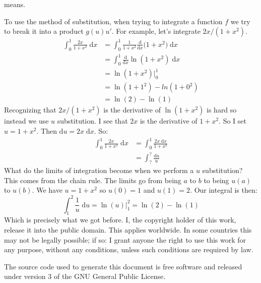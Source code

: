 \documentclass{article}
\begin{document}
    means.
    \par\hfill\par
    To use the method of substitution, when trying to integrate a function
    $f$ we try to break it into a product $g(u)u'$. For example, let's
    integrate $2x/(1+x^{2})$.
    \begin{align}
        \int_{0}^{1}\frac{2x}{1+x^{2}}\;\textrm{d}x
            &=\int_{0}^{1}\frac{1}{1+x^{2}}\frac{\textrm{d}}{\textrm{d}x}
                \big(1+x^{2}\big)\;\textrm{d}x\\
            &=\int_{0}^{1}\frac{\textrm{d}}{\textrm{d}x}
                \ln(1+x^{2})\;\textrm{d}x\\
            &=\ln(1+x^{2})\big|_{0}^{1}\\
            &=\ln(1+1^{2})-ln(1+0^{2})\\
            &=\ln(2)-\ln(1)
    \end{align}
    Recognizing that $2x/(1+x^{2})$ is the derivative of $\ln(1+x^{2})$ is hard
    so instead we use $u$ substitution. I see that
    $2x$ is the derivative of $1+x^{2}$. So I set $u=1+x^{2}$. Then
    $\textrm{d}u=2x\;\textrm{d}x$. So:
    \begin{align}
        \int_{0}^{1}\frac{2x}{1+x^{2}}\;\textrm{d}x
            &=\int_{0}^{1}\frac{2x\;\textrm{d}x}{1+x^{2}}\\
            &=\int_{?}^{?}\frac{\textrm{d}u}{u}
    \end{align}
    What do the limits of integration become when we perform a $u$ substitution?
    This comes from the chain rule. The limits go from being $a$ to $b$ to
    being $u(a)$ to $u(b)$. We have $u=1+x^{2}$ so $u(0)=1$ and $u(1)=2$.
    Our integral is then:
    \begin{equation}
        \int_{1}^{2}\frac{1}{u}\;\textrm{d}u=\ln(u)\big|_{1}^{2}
            =\ln(2)-\ln(1)
    \end{equation}
    Which is precisely what we got before.
    \newpage
    I, the copyright holder of this work, release it into the public domain.
    This applies worldwide. In some countries this may not be legally possible;
    if so: I grant anyone the right to use this work for any purpose, without
    any conditions, unless such conditions are required by law.
    \par\hfill\par
    The source code used to generate this document is free software and released
    under version 3 of the GNU General Public License.
\end{document}
